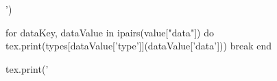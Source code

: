 \documentclass[letterpaper,11pt]{article}
\begin{document}
')

    for dataKey, dataValue in ipairs(value["data"]) do
        tex.print(types[dataValue['type']](dataValue['data']))
        break
    end

    tex.print('\
\end{document}
